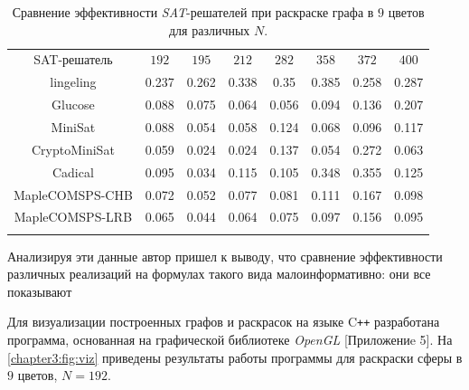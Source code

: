 \begin{table}[h!]
\centering
\captionsetup{justification=centering}
\caption{Сравнение эффективности \textit{SAT}-решателей при раскраске графа в $9$ цветов для различных $N$.}
\label{chapter3:tab:color9}
\begin{tabular}{@{}|c|c|c|c|c|c|c|c|}
\Xhline{4\arrayrulewidth}
SAT-решатель          & $192$ & $195$ & $212$ & $282$ & $358$ & $372$ & $400$ \\ \Xhline{4\arrayrulewidth}
lingeling             & 0.237 & 0.262 & 0.338 & 0.35  & 0.385 & 0.258 & 0.287 \\ \hline
Glucose               & 0.088 & 0.075 & 0.064 & 0.056 & 0.094 & 0.136 & 0.207 \\ \hline
MiniSat               & 0.088 & 0.054 & 0.058 & 0.124 & 0.068 & 0.096 & 0.117 \\ \hline
CryptoMiniSat         & 0.059 & 0.024 & 0.024 & 0.137 & 0.054 & 0.272 & 0.063 \\ \hline
Cadical               & 0.095 & 0.034 & 0.115 & 0.105 & 0.348 & 0.355 & 0.125 \\ \hline
MapleCOMSPS-CHB       & 0.072 & 0.052 & 0.077 & 0.081 & 0.111 & 0.167 & 0.098 \\ \hline
MapleCOMSPS-LRB       & 0.065 & 0.044 & 0.064 & 0.075 & 0.097 & 0.156 & 0.095 \\ \Xhline{4\arrayrulewidth}
\end{tabular}
\end{table}

Анализируя эти данные автор пришел к выводу, что сравнение эффективности различных реализаций
на формулах такого вида малоинформативно: они все показывают 

Для визуализации построенных графов и раскрасок на языке C\texttt{++} разработана программа, 
основанная на графической библиотеке \textit{OpenGL} [Приложениe 5]. 
На \figurename{ \ref{chapter3:fig:viz}} приведены результаты работы программы для раскраски сферы в $9$ цветов, $N=192$.

